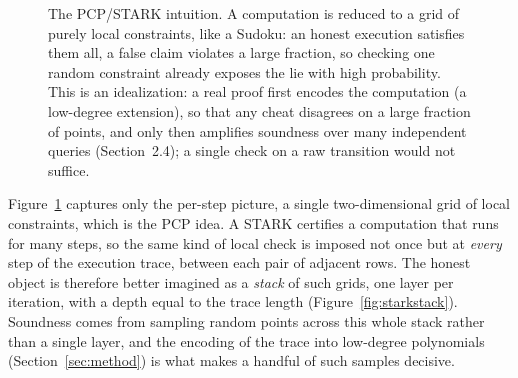 \documentclass[11pt]{article}
\begin{document}
\begin{figure}[H]\centering
{}
\caption{The PCP/STARK intuition. A computation is reduced to a grid of purely local constraints, like a
Sudoku: an honest execution satisfies them all, a false claim violates a large fraction, so checking
one random constraint already exposes the lie with high probability. This is an idealization: a real
proof first encodes the computation (a low-degree extension), so that any cheat disagrees on a large
fraction of points, and only then amplifies soundness over many independent queries (Section~2.4); a
single check on a raw transition would not suffice.}
\label{fig:sudoku}
\end{figure}

Figure~\ref{fig:sudoku} captures only the per-step picture, a single two-dimensional grid of local
constraints, which is the PCP idea. A STARK certifies a computation that runs for many steps, so the same
kind of local check is imposed not once but at \emph{every} step of the execution trace, between each pair
of adjacent rows. The honest object is therefore better imagined as a \emph{stack} of such grids, one
layer per iteration, with a depth equal to the trace length (Figure~\ref{fig:starkstack}). Soundness comes
from sampling random points across this whole stack rather than a single layer, and the encoding of the
trace into low-degree polynomials (Section~\ref{sec:method}) is what makes a handful of such samples
decisive.
\end{document}
